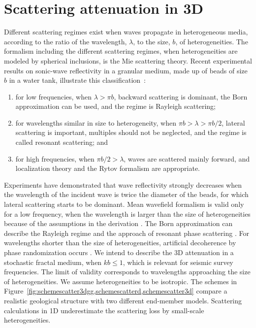 \section{Scattering attenuation in 3D}


Different scattering regimes exist when waves propagate in heterogeneous media,
according to the ratio of the wavelength, $\lambda$, to the size, $b$, of heterogeneities.
The formalism including the different scattering regimes,
when heterogeneities are modeled by spherical inclusions,
is the Mie scattering theory.
Recent experimental results 
\cite[]{Legonidec_G07} 
on sonic-wave reflectivity in a granular medium,
made up of beads of size $b$ in a water tank, illustrate this classification~:
\begin{enumerate}
\item for low frequencies, when $\lambda>\pi b$, backward scattering is dominant,
the Born approximation can be used, and the regime is Rayleigh scattering;
\item for wavelengths similar in size to heterogeneity, when $\pi b>\lambda>\pi b/2$,
lateral scattering is important, multiples should not be neglected,
and the regime is called resonant scattering; and
\item for high frequencies, when $\pi b/2>\lambda$, waves are scattered mainly forward, and
localization theory and the Rytov formalism are appropriate.
\end{enumerate}
Experiments have demonstrated that wave reflectivity strongly decreases 
when the wavelength of the incident wave is twice the diameter of the beads,
for which lateral scattering starts to be dominant.
Mean wavefield formalism is valid only for a low frequency,
when the wavelength is larger than the size of heterogeneities
because of the assumptions in the derivation \cite[]{Karal_K64}.
The Born approximation can describe the Rayleigh regime and the approach of resonant phase scattering \cite[]{Frankel_C86,Sato_F98}.
For wavelengths shorter than the size of heterogeneities, 
artificial decoherence by phase randomization occurs \cite[]{Wu_82,Sato_F98}.
We intend to describe the 3D attenuation in a stochastic fractal medium,
when $kb\leq1$, which is relevant for seismic survey frequencies.
The limit of validity corresponds to wavelengths approaching the size of heterogeneities.
We assume heterogeneities to be isotropic.
The schemes in Figure~\ref{fig:schemescatter3dgg,schemescatterd,schemescatter3d}
compare a realistic geological structure
with two different end-member models.
Scattering calculations in 1D underestimate the scattering loss by small-scale heterogeneities.

